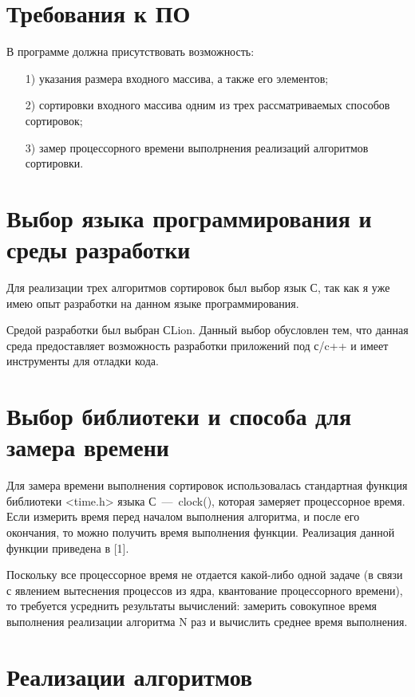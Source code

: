 \documentclass[12pt]{report}
\begin{document}
	\section{Требования к ПО}
	
	В программе должна присутствовать возможность:
	
	\begin{enumerate}
		\item[1)] указания размера входного массива, а также его элементов;
		\item[2)] сортировки входного массива одним из трех рассматриваемых способов сортировок;
		\item[3)] замер процессорного времени выполрнения реализаций алгоритмов сортировки.
	\end{enumerate}
	
	\section{Выбор языка программирования и среды разработки}
	
	Для реализации трех алгоритмов сортировок был выбор язык С, так как я уже имею опыт разработки на данном языке программирования.

	Средой разработки был выбран СLion. Данный выбор обусловлен тем, что данная среда предоставляет возможность разработки приложений под с/c++ и имеет инструменты для отладки кода. 
	
	\section{Выбор библиотеки и способа для замера времени}
		Для замера времени выполнения сортировок использовалась стандартная функция библиотеки <time.h> языка С~---~clock(), которая замеряет процессорное время. Если измерить время перед началом выполнения алгоритма, и после его окончания, то можно получить время выполнения функции. Реализация данной функции приведена в [1].
		
		Поскольку все процессорное время не отдается какой-либо одной задаче (в связи с явлением вытеснения процессов из ядра, квантование процессорного времени), то требуется усреднить результаты вычислений: замерить совокупное время выполнения реализации алгоритма N раз и вычислить среднее время выполнения.
		
	\section{Реализации алгоритмов}
	
\end{document}
